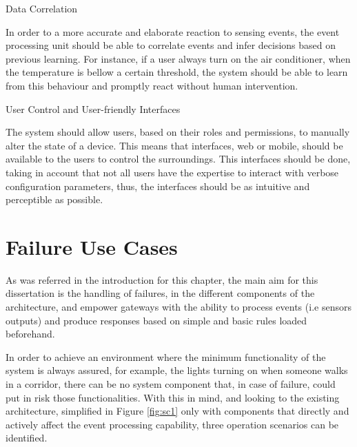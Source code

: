 \begin{Paragraph}{Data Correlation}

In order to a more accurate and elaborate reaction to sensing events, the event processing unit should be able to correlate events and infer decisions based on previous learning. For instance, if a user always turn on the air conditioner, when the temperature is bellow a certain threshold, the system should be able to learn from this behaviour and promptly react without human intervention.

\end{Paragraph}

\begin{Paragraph}{User Control and User-friendly Interfaces}
	
The system should allow users, based on their roles and permissions, to manually alter the state of a device. This means that interfaces, web or mobile, should be available to the users to control the surroundings. This interfaces should be done, taking in account that not all users have the expertise to interact with verbose configuration parameters, thus, the interfaces should be as intuitive and perceptible as possible.
	
\end{Paragraph}




\section{Failure Use Cases}
\label{Architecture:usecases}

As was referred in the introduction for this chapter, the main aim for this dissertation is the handling of failures, in the different components of the architecture, and empower gateways with the ability to process events (i.e sensors outputs) and produce responses based on simple and basic rules loaded beforehand.

In order to achieve an environment where the minimum functionality of the system is always assured, for example, the lights turning on when someone walks in a corridor, there can be no system component that, in case of failure, could put in risk those functionalities. With this in mind, and looking to the existing architecture, simplified in Figure \ref{fig:sc1} only with components that directly and actively affect the event processing capability, three operation scenarios can be identified. 



